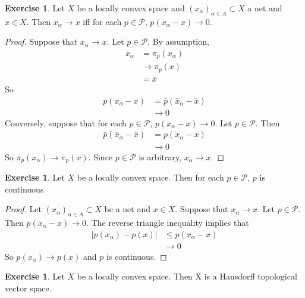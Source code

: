 \documentclass[12pt]{amsart}
\theoremstyle{definition}
\newtheorem{ex}[definition]{Exercise}
\newcommand{\al}{\alpha}
\newcommand{\MP}{\mathcal{P}}
\begin{document}
	\begin{ex}
		Let $X$ be a locally convex space and $(x_{\al})_{\al \in A} \subset X$ a net and $x \in X$. Then $x_{\al} \rightarrow x$ iff for each $p \in \MP$, $p(x_{\al} - x) \rightarrow 0$.
	\end{ex}
	
	\begin{proof}
		Suppose that $x_{\al} \rightarrow x$. Let $p \in \MP$. 
		By assumption,  
		\begin{align*}
			\bar{x}_{\al} 
			&= \pi_p(x_{\al}) \\
			&\rightarrow \pi_p(x) \\
			&= \bar{x}
		\end{align*}   
		So 
		\begin{align*}
			p(x_{\al} - x) 
			&= \bar{p}(\bar{x}_{\al} - \bar{x}) \\
			& \rightarrow 0
		\end{align*}
		Conversely, suppose that for each $p \in \MP$, $p(x_{\al} - x) \rightarrow 0$. Let $p \in \MP$. Then 
		\begin{align*}
			\bar{p}(\bar{x}_{\al} - \bar{x}) 
			&= p(x_{\al} - x) \\
			& \rightarrow 0
		\end{align*} 
		So $\pi_p(x_{\al}) \rightarrow \pi_p(x)$. Since $p \in \MP$ is arbitrary, $x_{\al} \rightarrow x$. 
	\end{proof}
	
	\begin{ex}
		Let $X$ be a locally convex space. Then for each $p \in \MP$, $p$ is continuous. 
	\end{ex}
	
	\begin{proof}
		Let $(x_{\al})_{\al \in A} \subset X$ be a net and $x \in X$. Suppose that $x_{\al} \rightarrow x$. Let $p \in \MP$. Then $p(x_{\al} - x) \rightarrow 0$. The reverse triangle inequality implies that 
		\begin{align*}
			|p(x_{\al}) - p(x)| 
			& \leq p(x_{\al} - x) \\
			& \rightarrow 0
		\end{align*}
		So $p(x_{\al}) \rightarrow p(x)$ and $p$ is continuous. 
	\end{proof}
	
	\begin{ex}
		Let $X$ be a locally convex space. Then X is a Hausdorff topological vector space.
	\end{ex}
	
\end{document}
